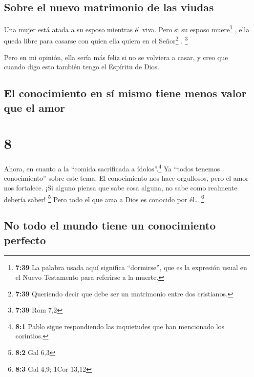 \hypertarget{sobre-el-nuevo-matrimonio-de-las-viudas}{%
\subsection{Sobre el nuevo matrimonio de las
viudas}\label{sobre-el-nuevo-matrimonio-de-las-viudas}}

 Una mujer está atada a su esposo mientras él viva. Pero
si su esposo muere\footnote{\textbf{7:39} La palabra usada aquí
  significa ``dormirse'', que es la expresión usual en el Nuevo
  Testamento para referirse a la muerte.} , ella queda libre para
casarse con quien ella quiera en el Señor\footnote{\textbf{7:39}
  Queriendo decir que debe ser un matrimonio entre dos cristianos.} .
\footnote{\textbf{7:39} Rom 7,2}

 Pero en mi opinión, ella sería más feliz si no se
volviera a casar, y creo que cuando digo esto también tengo el Espíritu
de Dios.

\hypertarget{el-conocimiento-en-suxed-mismo-tiene-menos-valor-que-el-amor}{%
\subsection{El conocimiento en sí mismo tiene menos valor que el
amor}\label{el-conocimiento-en-suxed-mismo-tiene-menos-valor-que-el-amor}}

\hypertarget{section-7}{%
\section{8}\label{section-7}}

 Ahora, en cuanto a la ``comida sacrificada a
ídolos''.\footnote{\textbf{8:1} Pablo sigue respondiendo las inquietudes
  que han mencionado los corintios.} Ya ``todos tenemos conocimiento''
sobre este tema. El conocimiento nos hace orgullosos, pero el amor nos
fortalece.  ¡Si alguno piensa que sabe cosa alguna, no
sabe como realmente debería saber! \footnote{\textbf{8:2} Gal 6,3}
 Pero todo el que ama a Dios es conocido por él\ldots{}
\footnote{\textbf{8:3} Gal 4,9; 1Cor 13,12}

\hypertarget{no-todo-el-mundo-tiene-un-conocimiento-perfecto}{%
\subsection{No todo el mundo tiene un conocimiento
perfecto}\label{no-todo-el-mundo-tiene-un-conocimiento-perfecto}}

